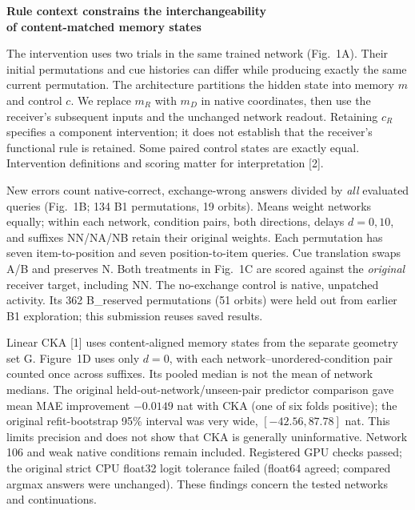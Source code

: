 \documentclass[12pt,letterpaper]{article}
\newcommand{\blocktitle}[1]{\par\vspace{4pt}{\bfseries #1}\par\vspace{1pt}}
\begin{document}
\begin{center}
{\fontsize{16.1}{18}\selectfont\bfseries
Rule context constrains the interchangeability\\
of content-matched memory states}
\end{center}
\vspace{-5pt}
\blocktitle{Summary}


\blocktitle{Additional Detail}
The intervention uses two trials in the same trained network (Fig.~1A).
Their initial permutations and cue histories can differ while producing exactly
the same current permutation. The architecture partitions the hidden state into
memory $m$ and control $c$. We replace $m_R$ with $m_D$ in native coordinates,
then use the receiver's subsequent inputs and the unchanged network readout.
Retaining $c_R$ specifies a component intervention; it does not establish that
the receiver's functional rule is retained. Some paired control states are
exactly equal. Intervention definitions and scoring matter for interpretation [2].

New errors count native-correct, exchange-wrong answers divided by \emph{all}
evaluated queries (Fig.~1B; 134 B1 permutations, 19 orbits). Means weight networks
equally; within each network, condition pairs, both directions, delays
$d=0,10$, and suffixes NN/NA/NB retain their original weights. Each permutation
has seven item-to-position and seven position-to-item queries. Cue translation
swaps A/B and preserves N. Both treatments in Fig.~1C are scored against the
\emph{original} receiver target, including NN. The no-exchange control is native,
unpatched activity. Its 362 B\_reserved permutations (51 orbits) were held out
from earlier B1 exploration; this submission reuses saved results.

Linear CKA [1] uses content-aligned memory states from the separate geometry set
G. Figure~1D uses only $d=0$, with each network--unordered-condition pair counted
once across suffixes. Its pooled median is not the mean of network medians.
The original held-out-network/unseen-pair predictor comparison gave mean MAE
improvement $-0.0149$ nat with CKA (one of six folds positive); the original
refit-bootstrap 95\% interval was very wide, $[-42.56,87.78]$ nat. This limits
precision and does not show that CKA is generally uninformative.
Network 106 and weak native conditions remain included.
Registered GPU checks passed; the original strict CPU float32 logit tolerance
failed (float64 agreed; compared argmax answers were unchanged).
These findings concern the tested networks and continuations.
\end{document}
